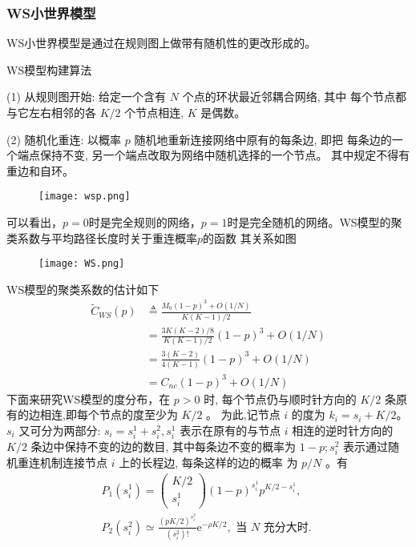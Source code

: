 \subsubsection*{WS小世界模型}
WS小世界模型是通过在规则图上做带有随机性的更改形成的。\par
\noindent WS模型构建算法\par
\noindent(1) 从规则图开始: 给定一个含有 $N$ 个点的环状最近邻耦合网络, 其中 每个节点都与它左右相邻的各 $K / 2$ 个节点相连, $K$ 是偶数。\par
\noindent(2) 随机化重连: 以概率 $p$ 随机地重新连接网络中原有的每条边, 即把 每条边的一个端点保持不变, 另一个端点改取为网络中随机选择的一个节点。
其中规定不得有重边和自环。\par
\begin{figure}[!htbp]
    \centering
    \texttt{[image: wsp.png]}
\end{figure}
可以看出，$p=0$时是完全规则的网络，$p=1$时是完全随机的网络。WS模型的聚类系数与平均路径长度时关于重连概率$p$的函数
其关系如图
\begin{figure}[!htbp]
    \centering
    \texttt{[image: WS.png]}
\end{figure}
WS模型的聚类系数的估计如下
\begin{equation}
    \begin{aligned}
    \tilde{C}_{W S}(p) & \triangleq \frac{M_0(1-p)^3+O(1 / N)}{K(K-1) / 2} \\
    & =\frac{3 K(K-2) / 8}{K(K-1) / 2}(1-p)^3+O(1 / N) \\
    & =\frac{3(K-2)}{4(K-1)}(1-p)^3+O(1 / N) \\
    & =C_{n c}(1-p)^3+O(1 / N)
    \end{aligned}
\end{equation}
下面来研究WS模型的度分布，在 $p>0$ 时, 每个节点仍与顺时针方向的 $K / 2$ 条原有的边相连,即每个节点的度至少为 $K / 2$ 。
 为此,记节点 $i$ 的度为 $k_i=s_i+K / 2$。 $s_i$ 又可分为两部分: 
 $s_i=s_i^1+s_i^2, s_i^1$ 表示在原有的与节点 $i$ 相连的逆时针方向的 $K / 2$ 条边中保持不变的边的数目, 
 其中每条边不变的概率为 $1-p ; s_i^2$ 表示通过随机重连机制连接节点 $i$ 上的长程边, 
 每条这样的边的概率 为 $p / N$ 。有
 \begin{equation}
    \begin{gathered}
    P_1\left(s_i^1\right)=\left(\begin{array}{c}
    K / 2 \\
    s_i^1
    \end{array}\right)(1-p)^{s_i^{1}} p^{K / 2-s_i^1}, \\
    P_2\left(s_i^2\right) \simeq \frac{(p K / 2)^{s_i^2}}{\left(s_i^2\right) !} \mathrm{e}^{-\rho K / 2}, \text { 当 } N \text { 充分大时. }
    \end{gathered}
\end{equation}
